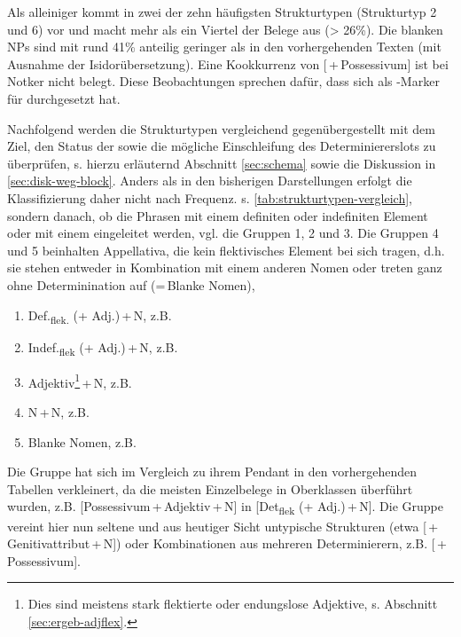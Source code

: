 Als alleiniger  kommt  in zwei der zehn häufigsten Strukturtypen (Strukturtyp 2 und 6) vor und macht mehr als ein Viertel der Belege aus (> 26\%). Die blanken NPs sind mit rund 41\% anteilig geringer als in den vorhergehenden Texten (mit Ausnahme der Isidorübersetzung). Eine Kookkurrenz von  [\,+\,Possessivum] ist bei Notker nicht belegt. Diese Beobachtungen sprechen dafür, dass  sich als -Marker für  durchgesetzt hat. 


Nachfolgend werden die Strukturtypen vergleichend gegenübergestellt mit dem Ziel, den Status der  sowie die mögliche Einschleifung  des Determiniererslots  zu überprüfen, s. hierzu erläuternd Abschnitt \ref{sec:schema} sowie die Diskussion in \ref{sec:disk-weg-block}. Anders als in den bisherigen Darstellungen erfolgt die Klassifizierung  daher nicht nach Frequenz. s. \ref{tab:strukturtypen-vergleich}, sondern danach, ob die Phrasen mit einem definiten  oder indefiniten  Element oder mit einem  eingeleitet werden, vgl. die Gruppen 1, 2 und 3. Die Gruppen 4 und 5 beinhalten  Appellativa, die kein flektivisches  Element bei sich tragen, d.h. sie stehen entweder in Kombination mit einem anderen Nomen  oder treten ganz ohne Determinination auf (=\,Blanke Nomen), 

\begin{enumerate}
\item Def.\textsubscript{flek.} (+ Adj.)\,+\,N, z.B.  
\item Indef.\textsubscript{flek} (+ Adj.)\,+\,N, z.B. 
\item Adjektiv\footnote{Dies sind meistens stark flektierte oder endungslose Adjektive, s. Abschnitt \ref{sec:ergeb-adjflex}.}\,+\,N, z.B.  
\item N\,+\,N, z.B. 
\item Blanke Nomen, z.B. 
\end{enumerate}

Die Gruppe  hat sich im Vergleich zu ihrem Pendant in den vorhergehenden Tabellen verkleinert, da die meisten Einzelbelege in Oberklassen überführt wurden,  z.B. [Possessivum\,+\,Adjektiv\,+\,N] in [Det\textsubscript{flek} (+ Adj.)\,+\,N]. Die Gruppe vereint hier nun seltene und aus heutiger Sicht untypische Strukturen (etwa  [\,+ Genitivattribut\,+\,N]) oder Kombinationen aus mehreren  Determinierern, z.B.  [\,+\,Possessivum]. 

